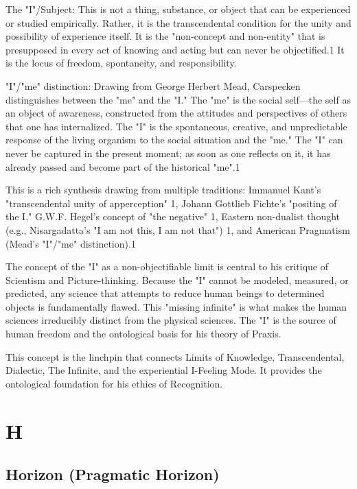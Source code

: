 \documentclass{book}
\begin{document}
\textit{}

The "I"/Subject: This is not a thing, substance, or object that can be experienced or studied empirically. Rather, it is the transcendental condition for the unity and possibility of experience itself. It is the "non-concept and non-entity" that is presupposed in every act of knowing and acting but can never be objectified.1 It is the locus of freedom, spontaneity, and responsibility.

"I"/"me" distinction: Drawing from George Herbert Mead, Carspecken distinguishes between the "me" and the "I." The "me" is the social self—the self as an object of awareness, constructed from the attitudes and perspectives of others that one has internalized. The "I" is the spontaneous, creative, and unpredictable response of the living organism to the social situation and the "me." The "I" can never be captured in the present moment; as soon as one reflects on it, it has already passed and become part of the historical "me".1

This is a rich synthesis drawing from multiple traditions: Immanuel Kant's "transcendental unity of apperception" 1, Johann Gottlieb Fichte's "positing of the I," G.W.F. Hegel's concept of "the negative" 1, Eastern non-dualist thought (e.g., Nisargadatta's "I am not this, I am not that") 1, and American Pragmatism (Mead's "I"/"me" distinction).1

The concept of the "I" as a non-objectifiable limit is central to his critique of Scientism and Picture-thinking. Because the "I" cannot be modeled, measured, or predicted, any science that attempts to reduce human beings to determined objects is fundamentally flawed. This "missing infinite" is what makes the human sciences irreducibly distinct from the physical sciences. The "I" is the source of human freedom and the ontological basis for his theory of Praxis.

This concept is the linchpin that connects Limits of Knowledge, Transcendental, Dialectic, The Infinite, and the experiential I-Feeling Mode. It provides the ontological foundation for his ethics of Recognition.

\parencite{Carspecken2009aa}




\chapter{H}

\section{Horizon (Pragmatic Horizon)}
\end{document}
